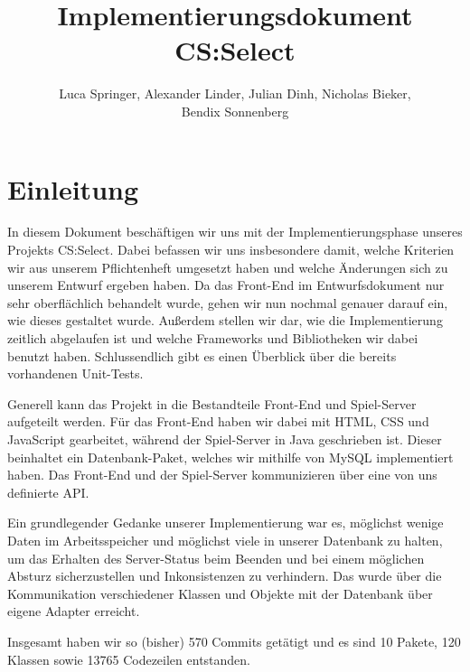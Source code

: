 \documentclass[a4paper]{scrreprt}
\begin{document}
\title{Implementierungsdokument CS:Select}
\author{Luca Springer, Alexander Linder, Julian Dinh, Nicholas Bieker,\\ Bendix Sonnenberg}
\maketitle

\tableofcontents


\chapter{Einleitung}

In diesem Dokument beschäftigen wir uns mit der Implementierungsphase unseres Projekts CS:Select. Dabei befassen wir uns insbesondere damit, welche Kriterien wir aus unserem Pflichtenheft umgesetzt haben und welche Änderungen sich zu unserem Entwurf ergeben haben. Da das Front-End im Entwurfsdokument nur sehr oberflächlich behandelt wurde, gehen wir nun nochmal genauer darauf ein, wie dieses gestaltet wurde. Außerdem stellen wir dar, wie die Implementierung zeitlich abgelaufen ist und welche Frameworks und Bibliotheken wir dabei benutzt haben. Schlussendlich gibt es einen Überblick über die bereits vorhandenen Unit-Tests.

\hspace{1cm}

Generell kann das Projekt in die Bestandteile Front-End und Spiel-Server aufgeteilt werden. Für das Front-End haben wir dabei mit HTML, CSS und JavaScript gearbeitet, während der Spiel-Server in Java geschrieben ist. Dieser beinhaltet ein Datenbank-Paket, welches wir mithilfe von MySQL implementiert haben. Das Front-End und der Spiel-Server kommunizieren über eine von uns definierte API.

\hspace{1cm}

Ein grundlegender Gedanke unserer Implementierung war es, möglichst wenige Daten im Arbeitsspeicher und möglichst viele in unserer Datenbank zu halten, um das Erhalten des Server-Status beim Beenden und bei einem möglichen Absturz sicherzustellen und Inkonsistenzen zu verhindern. Das wurde über die Kommunikation verschiedener Klassen und Objekte mit der Datenbank über eigene Adapter erreicht. 

\hspace{1cm}

Insgesamt haben wir so (bisher) 570 Commits getätigt und es sind 10 Pakete, 120 Klassen sowie 13765 Codezeilen entstanden.
\end{document}
